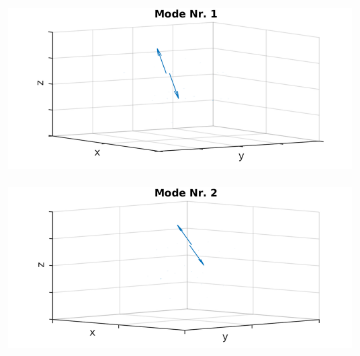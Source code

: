 \documentclass[numbers=noenddot,a4paper,notitlepage,twoside,BCOR15mm]{scrbook}
\begin{document}
							\begin{figure}[!t]
								\centering
								\begin{subfigure}[t]{0.325\textwidth}
									\centering
									\includegraphics[width=\textwidth,height=0.7\textwidth]{figs/auswertung/manipulation/dipol3HzModeNr1.png}
								\end{subfigure}
								\begin{subfigure}[t]{0.325\textwidth}
									\centering
									\includegraphics[width=\textwidth,height=0.7\textwidth]{figs/auswertung/manipulation/dipol3HzModeNr2.png}
								\end{subfigure}
								\begin{subfigure}[t]{0.325\textwidth}
									\centering

\end{subfigure}
\end{figure}
\end{document}
